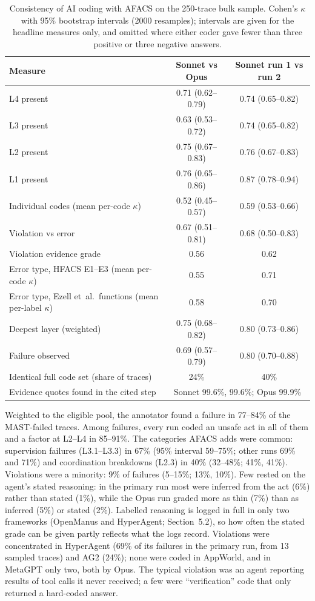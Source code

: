 \documentclass[11pt]{article}
\begin{document}
\begin{table}[tbp]
\centering
\caption{Consistency of AI coding with AFACS on the 250-trace bulk sample.
Cohen's $\kappa$ with 95\% bootstrap intervals (\num{2000} resamples); intervals are
given for the headline measures only, and omitted where either coder gave fewer
than three positive or three negative answers.}
\label{tab:rq3}
\small
\begin{tabular}{@{}lcc@{}}
\toprule
Measure & Sonnet vs Opus & Sonnet run 1 vs run 2\\
\midrule
L4 present & 0.71 (0.62--0.79) & 0.74 (0.65--0.82)\\
L3 present & 0.63 (0.53--0.72) & 0.74 (0.65--0.82)\\
L2 present & 0.75 (0.67--0.83) & 0.76 (0.67--0.83)\\
L1 present & 0.76 (0.65--0.86) & 0.87 (0.78--0.94)\\
Individual codes (mean per-code $\kappa$) & 0.52 (0.45--0.57) & 0.59 (0.53--0.66)\\
Violation vs error & 0.67 (0.51--0.81) & 0.68 (0.50--0.83)\\
Violation evidence grade & 0.56 & 0.62\\
Error type, HFACS E1--E3 (mean per-code $\kappa$) & 0.55 & 0.71\\
Error type, Ezell et~al.\ functions (mean per-label $\kappa$) & 0.58 & 0.70\\
Deepest layer (weighted) & 0.75 (0.68--0.82) & 0.80 (0.73--0.86)\\
Failure observed & 0.69 (0.57--0.79) & 0.80 (0.70--0.88)\\
Identical full code set (share of traces) & 24\% & 40\%\\
Evidence quotes found in the cited step & \multicolumn{2}{c}{Sonnet 99.6\%, 99.6\%; Opus 99.9\%}\\
\bottomrule
\end{tabular}
\end{table}

Weighted to the eligible pool, the annotator found a failure in 77--84\% of the
MAST-failed traces. Among failures, every run coded an unsafe act in all of them
and a factor at L2--L4 in 85--91\%. The categories AFACS adds were common:
supervision failures (L3.1--L3.3) in 67\% (95\% interval 59--75\%; other runs 69\%
and 71\%) and coordination breakdowns (L2.3) in 40\% (32--48\%; 41\%, 41\%).
Violations were a minority: 9\% of failures (5--15\%; 13\%, 10\%). Few rested on the
agent's stated reasoning: in the primary run most were inferred from the act (6\%)
rather than stated (1\%), while the Opus run graded more as thin (7\%) than as
inferred (5\%) or stated (2\%). Labelled reasoning is logged in full in only two frameworks (OpenManus and HyperAgent; Section~5.2), so how often the stated grade can be given partly reflects what the logs record. Violations were concentrated in HyperAgent (69\% of its failures in the primary run, from 13 sampled traces) and AG2 (24\%); none were coded in AppWorld, and in
MetaGPT only two, both by Opus. The typical violation was an agent reporting
results of tool calls it never received; a few were ``verification'' code that only
returned a hard-coded answer.
\end{document}
